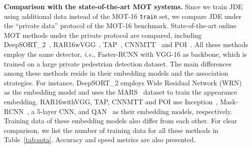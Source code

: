 \documentclass[runningheads]{llncs}
\def\ie{\textit{i.e.}}
\begin{document}
\textbf{Comparison with the state-of-the-art MOT systems.} Since we train JDE using additional data instead of the MOT-16 \texttt{train} set, we compare JDE under the ``private data'' protocol of the MOT-16 benchmark. State-of-the-art online MOT methods under the private protocol are compared, including DeepSORT\_2~\cite{deepsort}, RAR16wVGG~\cite{rar}, TAP~\cite{tap}, CNNMTT~\cite{cnnmtt} and POI~\cite{poi}. All these methods employ the same detector, \ie, Faster-RCNN with VGG-16 as backbone, which is trained on a large private pedestrian detection dataset. The main differences among these methods reside in their embedding models and the association strategies. For instance, DeepSORT\_2 employs Wide Residual Network (WRN)~\cite{wrn} as the embedding model and uses the MARS~\cite{mars} dataset to train the appearance embedding. RAR16withVGG, TAP, CNNMTT and POI use Inception~\cite{inception}, Mask-RCNN~\cite{maskrcnn}, a 5-layer CNN, and QAN~\cite{qan} as their embedding models, respectively. Training data of these embedding models also differ from each other. For clear comparison, we list the number of training data for all these methods in Table~\ref{tab:sota}. Accuracy and speed metrics are also presented. 
\end{document}

